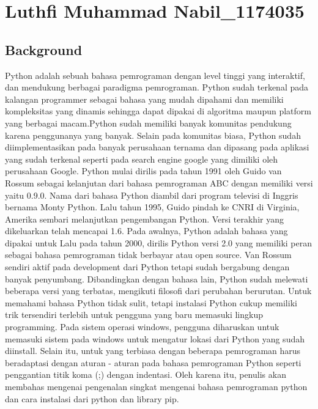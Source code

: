 \section{Luthfi Muhammad Nabil\_1174035}
\subsection{Background}
Python adalah sebuah bahasa pemrograman dengan level tinggi yang interaktif, dan mendukung berbagai paradigma pemrograman. Python sudah terkenal pada kalangan programmer sebagai bahasa yang mudah dipahami dan memiliki kompleksitas yang dinamis sehingga dapat dipakai di algoritma maupun platform yang berbagai macam.Python sudah memiliki banyak komunitas pendukung karena penggunanya yang banyak. Selain pada komunitas biasa, Python sudah diimplementasikan pada banyak perusahaan ternama dan dipasang pada aplikasi yang sudah terkenal seperti pada search engine google yang dimiliki oleh perusahaan Google. 
\linebreak
\linebreak
Python mulai dirilis pada tahun 1991 oleh Guido van Rossum sebagai kelanjutan dari bahasa pemrograman ABC dengan memiliki versi yaitu 0.9.0. Nama dari bahasa Python diambil dari program televisi di Inggris bernama Monty Python. Lalu tahun 1995, Guido pindah ke CNRI di Virginia, Amerika sembari melanjutkan pengembangan Python. Versi terakhir yang dikeluarkan telah mencapai 1.6. Pada awalnya, Python adalah bahasa yang dipakai untuk  Lalu pada tahun 2000, dirilis Python versi 2.0 yang memiliki peran sebagai bahasa pemrograman tidak berbayar atau open source. Van Rossum sendiri aktif pada development dari Python tetapi sudah bergabung dengan banyak penyumbang. Dibandingkan dengan bahasa lain, Python sudah melewati beberapa versi yang terbatas, mengikuti filosofi dari perubahan berurutan. 
\linebreak
\linebreak
Untuk memahami bahasa Python tidak sulit, tetapi instalasi Python cukup memiliki trik tersendiri terlebih untuk pengguna yang baru memasuki lingkup programming. Pada sistem operasi windows, pengguna diharuskan untuk memasuki sistem pada windows untuk mengatur lokasi dari Python yang sudah diinstall. Selain itu, untuk yang terbiasa dengan beberapa pemrograman harus beradaptasi dengan aturan - aturan pada bahasa pemrograman Python seperti penggantian titik koma (;) dengan indentasi. Oleh karena itu, penulis akan membahas mengenai pengenalan singkat mengenai bahasa pemrograman python dan cara instalasi dari python dan library pip.

